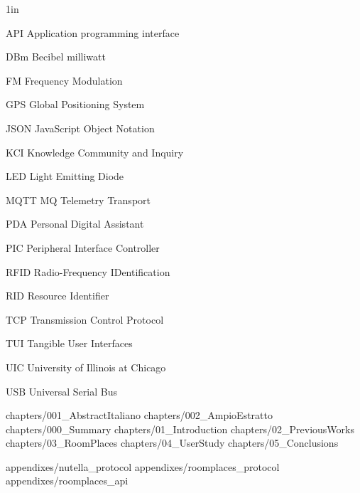 \documentclass{polimithesi}
\begin{document}
\tableofcontents
\listoftables
\listoffigures
\listofabbreviations
\begin{list}
{}
{\setlength
   {}{1in}
    \setlength{\leftmargin}{1.5in}
    \setlength{\labelsep}{.5in}
    \setlength{\rightmargin}{\leftmargin}}
\item[API\hfill] Application programming interface
\item[DBm\hfill] Becibel milliwatt
\item[FM\hfill] Frequency Modulation
\item[GPS\hfill] Global Positioning System
\item[JSON\hfill] JavaScript Object Notation
\item[KCI\hfill] Knowledge  Community  and  Inquiry
\item[LED\hfill] Light Emitting Diode
\item[MQTT\hfill] MQ Telemetry Transport
\item[PDA\hfill] Personal Digital Assistant
\item[PIC\hfill] Peripheral Interface Controller
\item[RFID\hfill] Radio-Frequency IDentification
\item[RID\hfill] Resource Identifier
\item[TCP\hfill] Transmission Control Protocol
\item[TUI\hfill] Tangible User Interfaces
\item[UIC\hfill] University of Illinois at Chicago
\item[USB\hfill] Universal Serial Bus
\end{list}

\squarebrackets %
\captionsetup[table]{skip=10pt} %

 {chapters/001_AbstractItaliano}
 {chapters/002_AmpioEstratto}
 {chapters/000_Summary}
 {chapters/01_Introduction}
 {chapters/02_PreviousWorks}
 {chapters/03_RoomPlaces}
 {chapters/04_UserStudy}
 {chapters/05_Conclusions}



\appendices
\newpage
\appendix

 {appendixes/nutella_protocol}
 {appendixes/roomplaces_protocol}
 {appendixes/roomplaces_api}

\nocite{*}
\bibformb


\newpage
\vita
\begin{singlespace}
\end{singlespace}
\end{document}
